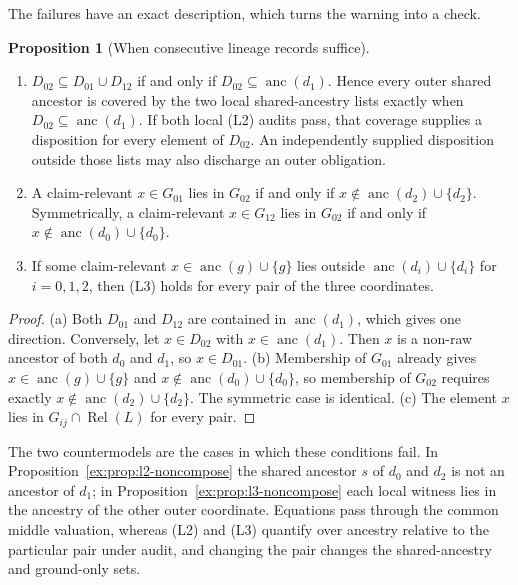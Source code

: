 \documentclass[11pt]{article}
\theoremstyle{definition}
\newtheorem{proposition}{Proposition}[section]
\begin{document}
The failures have an exact description, which turns the warning into a check.

\begin{proposition}[When consecutive lineage records suffice]\label{ex:prop:local-suffices}
\begin{enumerate}
\item[(a)] $D_{02}\subseteq D_{01}\cup D_{12}$ if and only if $D_{02}\subseteq\operatorname{anc}(d_1)$. Hence every outer shared ancestor is covered by the two local shared-ancestry lists exactly when $D_{02}\subseteq\operatorname{anc}(d_1)$. If both local (L2) audits pass, that coverage supplies a disposition for every element of $D_{02}$. An independently supplied disposition outside those lists may also discharge an outer obligation.
\item[(b)] A claim-relevant $x\in G_{01}$ lies in $G_{02}$ if and only if $x\notin\operatorname{anc}(d_2)\cup\{d_2\}$. Symmetrically, a claim-relevant $x\in G_{12}$ lies in $G_{02}$ if and only if $x\notin\operatorname{anc}(d_0)\cup\{d_0\}$.
\item[(c)] If some claim-relevant $x\in\operatorname{anc}(g)\cup\{g\}$ lies outside $\operatorname{anc}(d_i)\cup\{d_i\}$ for $i=0,1,2$, then (L3) holds for every pair of the three coordinates.
\end{enumerate}
\end{proposition}
\begin{proof}
(a) Both $D_{01}$ and $D_{12}$ are contained in $\operatorname{anc}(d_1)$, which gives one direction. Conversely, let $x\in D_{02}$ with $x\in\operatorname{anc}(d_1)$. Then $x$ is a non-raw ancestor of both $d_0$ and $d_1$, so $x\in D_{01}$. (b) Membership of $G_{01}$ already gives $x\in\operatorname{anc}(g)\cup\{g\}$ and $x\notin\operatorname{anc}(d_0)\cup\{d_0\}$, so membership of $G_{02}$ requires exactly $x\notin\operatorname{anc}(d_2)\cup\{d_2\}$. The symmetric case is identical. (c) The element $x$ lies in $G_{ij}\cap\operatorname{Rel}(L)$ for every pair.
\end{proof}

The two countermodels are the cases in which these conditions fail. In Proposition~\ref{ex:prop:l2-noncompose} the shared ancestor $s$ of $d_0$ and $d_2$ is not an ancestor of $d_1$; in Proposition~\ref{ex:prop:l3-noncompose} each local witness lies in the ancestry of the other outer coordinate. Equations pass through the common middle valuation, whereas (L2) and (L3) quantify over ancestry relative to the particular pair under audit, and changing the pair changes the shared-ancestry and ground-only sets.
\end{document}
